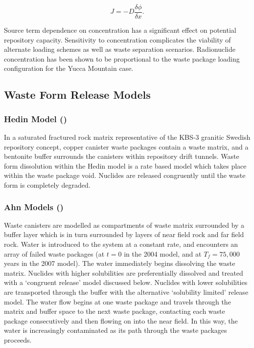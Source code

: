\begin{equation}
J = -D\frac{\delta\phi}{\delta x}.
\end{equation}

Source term dependence on concentration has a significant effect on 
potential repository capacity. Sensitivity to concentration 
complicates the viability of alternate loading schemes as well as 
waste separation scenarios. Radionuclide concentration has been shown 
to be proportional to the waste package loading configuration for the 
Yucca Mountain 
case.\cite{ahn_relationship_2002,kawasaki_congruent_2004}

\subsection{Waste Form Release Models}

\subsubsection{Hedin Model (\cite{hedin_integrated_2002})}

In a saturated fractured rock matrix representative of the KBS-3 
granitic Swedish repository concept, copper canister waste packages 
contain a waste matrix, and a bentonite buffer surrounds the canisters 
within repository drift tunnels. Waste form dissolution within the 
Hedin model is a rate based model which takes place within the waste 
package void. Nuclides are released congruently until the waste form 
is completely degraded. \cite{hedin_integrated_2002} 

\subsubsection{Ahn Models (\cite{ahn_environmental_2004, 
ahn_environmental_2007})}

Waste canisters are modelled as compartments of waste matrix 
surrounded by a buffer layer which is in turn surrounded by layers of 
near field rock and far field rock. Water is introduced to the system 
at a constant rate, and encounters an array of failed waste packages 
(at $t=0$ in the 2004 model, and at $T_f=75,000$ years in the 2007 
model). The water immediately begins dissolving the waste matrix.  
Nuclides with higher solubilities are preferentially dissolved and 
treated with a `congruent release' model discussed below. Nuclides 
with lower solubilities are transported through the buffer with the 
alternative `solubility limited' release model. The water flow begins 
at one waste package and travels through the matrix and buffer space 
to the next waste package, contacting each waste package consecutively 
and then flowing on into the near field. In this way, the water is 
increasingly contaminated as its path through the waste packages 
proceeds.  

